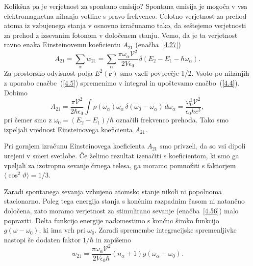 Kolikšna pa je verjetnost za spontano emisijo?
Spontana emisija je mogoča v vsa elektromagnetna nihanja votline s
pravo frekvenco. Celotno verjetnost za prehod atoma iz vzbujenega stanja
v osnovno izračunamo tako, da seštejemo verjetnosti za prehod z izsevanim fotonom 
v določenem stanju. Vemo, da je ta verjetnost ravno enaka 
Einsteinovemu koeficientu $A_{21}$ (enačba~\ref{4.27})
\begin{equation}
A_{21}=\sum_{\alpha}w_{21}=\sum_{\alpha}\frac{\pi \omega_{\alpha}\mathcal{V}^{2}}
{2V\epsilon_{0}}\,\delta(E_{2}-E_{1}-\hbar\omega_{\alpha}).
\label{4.57}
\end{equation}
Za prostorsko odvisnost polja $E^{2}(\mathbf{r})$ smo vzeli povprečje
1/2. Vsoto po nihanjih z uporabo enačbe~(\ref{4.5}) spremenimo v integral
in upoštevamo enačbo~(\ref{4.4}). Dobimo
\begin{equation}
A_{21}=\frac{\pi \mathcal{V}^{2}}{2\hbar\epsilon_{0}}\int\rho(\omega_{\alpha})\omega_\alpha\, 
\delta(\omega_{0}-\omega_{\alpha})\, d\omega_{\alpha}=\frac{\omega_{0}^{3}\mathcal{V}^{2}}{\epsilon_{0} h c^{3}},
\label{4.58}
\end{equation}
 pri čemer smo z $\omega_{0}=(E_{2}-E_{1})/\hbar$ označili frekvenco prehoda. Tako smo 
 izpeljali vrednost Einsteinovega koeficienta $A_{21}$. 
\begin{remark}
Pri gornjem izračunu Einsteinovega koeficienta $A_{21}$ smo privzeli, da so vsi dipoli urejeni  
 v smeri svetlobe. Če želimo rezultat izenačiti s koeficientom, ki smo ga vpeljali
 za izotropno sevanje črnega telesa, ga moramo pomnožiti s faktorjem $\langle \cos^2\vartheta
 \rangle = 1/3$.
\end{remark}

Zaradi spontanega sevanja vzbujeno atomsko stanje nikoli ni popolnoma
stacionarno. Poleg tega energija stanja s končnim razpadnim časom ni natančno
določena, zato moramo verjetnost za stimulirano sevanje (enačba~\ref{4.56}) malo 
popraviti. Delta funkcijo energije nadomestimo s končno široko  
funkcijo $g(\omega-\omega_0)$, ki ima vrh pri $\omega_{0}$. Zaradi 
spremembe integracijske spremenljivke nastopi še dodaten faktor $1/\hbar$ in zapišemo
\begin{equation}
w_{21}=\frac{\pi \omega_{\alpha}\mathcal{V}^{2}}{2V\epsilon_{0}\hbar}
(n_{\alpha}+1)g(\omega_{\alpha}-\omega_0).
\label{4.59}
\end{equation}

